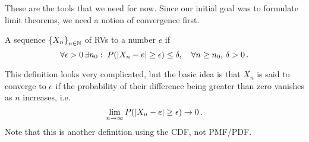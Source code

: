These are the tools that we need for now. Since our initial goal was to formulate limit theorems, we need a notion of convergence first.
\begin{defi}
A sequence $\qty{X_n}_{n \in \mathbb{N}}$ of RVs  to a number $e$ if
\begin{equation}
\forall \epsilon > 0 \, \exists n_0: \; P\qty(\abs{X_n - e} \geq \epsilon) \leq \delta, \quad \forall n \geq n_0, \, \delta > 0 \, .
\end{equation}
\end{defi}
This definition looks very complicated, but the basic idea is that $X_n$ is said to converge to $e$ if the probability of their difference being greater than zero vanishes as $n$ increases, i.e.
\begin{equation}
\lim_{n \rightarrow \infty} P\qty(\abs{X_n - e} \geq \epsilon) \rightarrow 0 \, .
\end{equation}
Note that this is another definition using the CDF, not PMF/PDF.


